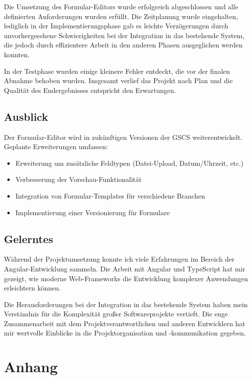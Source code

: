 \documentclass[a4paper,11pt]{article}
\begin{document}
Die Umsetzung des Formular-Editors wurde erfolgreich abgeschlossen und alle definierten Anforderungen wurden erfüllt. Die Zeitplanung wurde eingehalten, lediglich in der Implementierungsphase gab es leichte Verzögerungen durch unvorhergesehene Schwierigkeiten bei der Integration in das bestehende System, die jedoch durch effizientere Arbeit in den anderen Phasen ausgeglichen werden konnten.

In der Testphase wurden einige kleinere Fehler entdeckt, die vor der finalen Abnahme behoben wurden. Insgesamt verlief das Projekt nach Plan und die Qualität des Endergebnisses entspricht den Erwartungen.

\subsection{Ausblick}

Der Formular-Editor wird in zukünftigen Versionen der GSCS weiterentwickelt. Geplante Erweiterungen umfassen:

\begin{itemize}
\item Erweiterung um zusätzliche Feldtypen (Datei-Upload, Datum/Uhrzeit, etc.)
\item Verbesserung der Vorschau-Funktionalität
\item Integration von Formular-Templates für verschiedene Branchen
\item Implementierung einer Versionierung für Formulare
\end{itemize}

\subsection{Gelerntes}

Während der Projektumsetzung konnte ich viele Erfahrungen im Bereich der Angular-Entwicklung sammeln. Die Arbeit mit Angular und TypeScript hat mir gezeigt, wie moderne Web-Frameworks die Entwicklung komplexer Anwendungen erleichtern können.

Die Herausforderungen bei der Integration in das bestehende System haben mein Verständnis für die Komplexität großer Softwareprojekte vertieft. Die enge Zusammenarbeit mit dem Projektverantwortlichen und anderen Entwicklern hat mir wertvolle Einblicke in die Projektorganisation und -kommunikation gegeben.

\newpage
\appendix
\section{Anhang}
\end{document}
